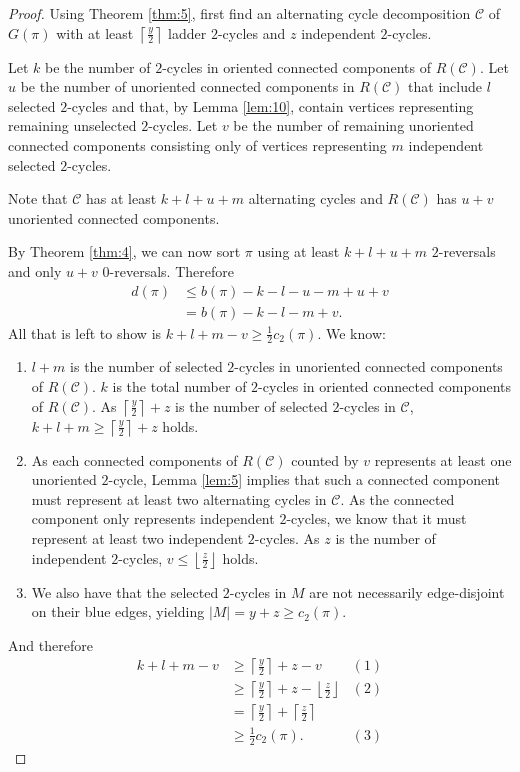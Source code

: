 \documentclass[11pt,DIV=11]{scrartcl}
\theoremstyle{definition}
\theoremstyle{remark}
\begin{document}
\begin{proof}
Using Theorem \ref{thm:5}, first find an alternating cycle decomposition $\mathcal{C}$ of $G(\pi)$ with at least $\left\lceil \frac{y}{2} \right\rceil$ ladder $2$-cycles and $z$ independent $2$-cycles.

Let $k$ be the number of $2$-cycles in oriented connected components of $R(\mathcal{C})$. Let $u$ be the number of unoriented connected components in $R(\mathcal{C})$ that include $l$ selected $2$-cycles and that, by Lemma \ref{lem:10}, contain vertices representing remaining unselected $2$-cycles. Let $v$ be the number of remaining unoriented connected components consisting only of vertices representing $m$ independent selected $2$-cycles.

Note that $\mathcal{C}$ has at least $k+l+u+m$ alternating cycles and $R(\mathcal{C})$ has $u+v$ unoriented connected components.

By Theorem \ref{thm:4}, we can now sort $\pi$ using at least $k+l+u+m$ $2$-reversals and only $u+v$ $0$-reversals. Therefore
\begin{align*}
    d(\pi) &\leq b(\pi) - k - l - u - m + u + v \\
           &= b(\pi) - k - l - m + v.
\end{align*}
All that is left to show is $k+l+m-v \geq \frac{1}{2} c_2(\pi)$. We know:
\begin{enumerate}
    \item $l+m$ is the number of selected $2$-cycles in unoriented connected components of $R(\mathcal{C})$. $k$ is the total number of $2$-cycles in oriented connected components of $R(\mathcal{C})$. As $\left\lceil \frac{y}{2} \right\rceil + z$ is the number of selected $2$-cycles in $\mathcal{C}$, $k+l+m \geq \left\lceil \frac{y}{2} \right\rceil + z$ holds.
    \item As each connected components of $R(\mathcal{C})$ counted by $v$ represents at least one unoriented $2$-cycle, Lemma \ref{lem:5} implies that such a connected component must represent at least two alternating cycles in $\mathcal{C}$. As the connected component only represents independent $2$-cycles, we know that it must represent at least two independent $2$-cycles. As $z$ is the number of independent $2$-cycles, $v \leq \left\lfloor \frac{z}{2} \right\rfloor$ holds.
    \item We also have that the selected $2$-cycles in $M$ are not necessarily edge-disjoint on their blue edges, yielding $|M| = y+z \geq c_2(\pi)$.
\end{enumerate}
And therefore
\begin{align*}
    k+l+m-v &\geq \left\lceil \frac{y}{2} \right\rceil + z - v                                          & (1) \\
            &\geq \left\lceil \frac{y}{2} \right\rceil + z - \left\lfloor \frac{z}{2} \right\rfloor     & (2) \\
            &= \left\lceil \frac{y}{2} \right\rceil + \left\lceil \frac{z}{2} \right\rceil \\
            &\geq \frac{1}{2} c_2(\pi).                                                                 & (3)
\end{align*}
\end{proof}
\end{document}
